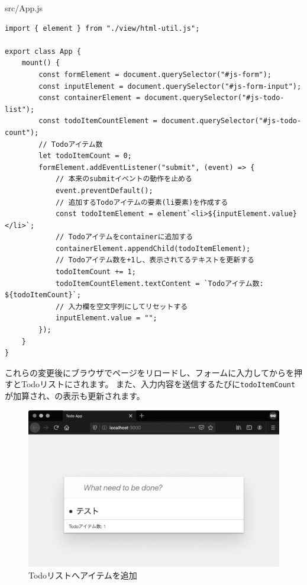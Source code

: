 \begin{listtitle}
src/App.js
\end{listtitle}
\begin{lstlisting}
import { element } from "./view/html-util.js";

export class App {
    mount() {
        const formElement = document.querySelector("#js-form");
        const inputElement = document.querySelector("#js-form-input");
        const containerElement = document.querySelector("#js-todo-list");
        const todoItemCountElement = document.querySelector("#js-todo-count");
        // Todoアイテム数
        let todoItemCount = 0;
        formElement.addEventListener("submit", (event) => {
            // 本来のsubmitイベントの動作を止める
            event.preventDefault();
            // 追加するTodoアイテムの要素(li要素)を作成する
            const todoItemElement = element`<li>${inputElement.value}</li>`;
            // Todoアイテムをcontainerに追加する
            containerElement.appendChild(todoItemElement);
            // Todoアイテム数を+1し、表示されてるテキストを更新する
            todoItemCount += 1;
            todoItemCountElement.textContent = `Todoアイテム数: ${todoItemCount}`;
            // 入力欄を空文字列にしてリセットする
            inputElement.value = "";
        });
    }
}
\end{lstlisting}
\listend

これらの変更後にブラウザでページをリロードし、フォームに入力してからを押すとTodoリストに\textbf{}されます。
また、入力内容を送信するたびに\texttt{todoItemCount}が加算され、\textbf{}の表示も更新されます。

\begin{figure}[h]
\centering
\includegraphics[width=120mm]{./fig/add-todo-item.eps}
\caption{Todoリストへアイテムを追加}
\end{figure}

